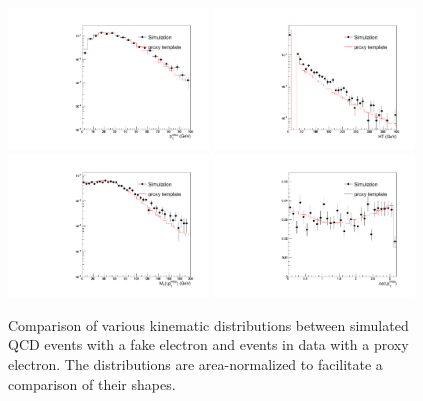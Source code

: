 \documentclass[thesis.tex]{subfiles}
\renewcommand\_{\textunderscore\allowbreak}
\begin{document}
\begin{figure}[hbtp]\begin{center}
    \includegraphics[width=0.475\textwidth]{Figures/faketemp_electron_met.pdf}
    \includegraphics[width=0.475\textwidth]{Figures/faketemp_electron_ht.pdf}
    \includegraphics[width=0.475\textwidth]{Figures/faketemp_electron_mt.pdf}
    \includegraphics[width=0.475\textwidth]{Figures/faketemp_electron_dPhi.pdf}
    \caption{Comparison of various kinematic distributions between simulated
        QCD events with a fake electron and events in data with a proxy
        electron. The distributions are area-normalized to facilitate a
        comparison of their shapes.}
        \label{fig:c_electron}
\end{center}\end{figure}
\end{document}
